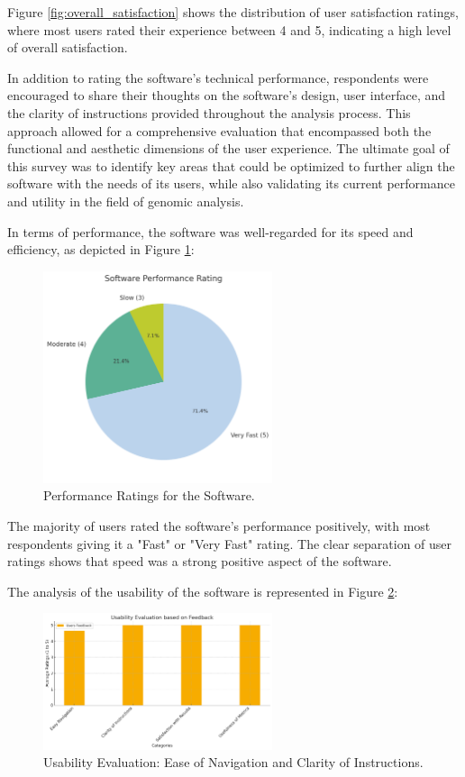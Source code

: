 Figure \ref{fig:overall_satisfaction} shows the distribution of user satisfaction ratings, where most users rated their experience between 4 and 5, indicating a high level of overall satisfaction.

In addition to rating the software's technical performance, respondents were encouraged to share their thoughts on the software's design, user interface, and the clarity of instructions provided throughout the analysis process. This approach allowed for a comprehensive evaluation that encompassed both the functional and aesthetic dimensions of the user experience. The ultimate goal of this survey was to identify key areas that could be optimized to further align the software with the needs of its users, while also validating its current performance and utility in the field of genomic analysis.

In terms of performance, the software was well-regarded for its speed and efficiency, as depicted in Figure \ref{fig:performance}:

\begin{figure}[H] 
    \centering 
    \includegraphics[width=0.6\textwidth]{figs/performance_pie_chart.png} 
    \caption{Performance Ratings for the Software.}
    \label{fig:performance}
\end{figure}

The majority of users rated the software's performance positively, with most respondents giving it a "Fast" or "Very Fast" rating. The clear separation of user ratings shows that speed was a strong positive aspect of the software.

The analysis of the usability of the software is represented in Figure \ref{fig:usability}:

\begin{figure}[H] 
    \centering 
    \includegraphics[width=0.6\textwidth]{figs/usability_grouped_bars.png} 
    \caption{Usability Evaluation: Ease of Navigation and Clarity of Instructions.}
    \label{fig:usability}
\end{figure}

